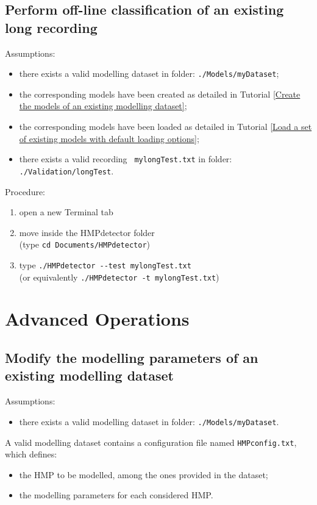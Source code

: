\documentclass[10pt,a4paper]{report}
\begin{document}
\section{Perform off-line classification of an existing long recording}
Assumptions:
\begin{itemize}
\item there exists a valid modelling dataset in folder: \verb+./Models/myDataset+;
\item the corresponding models have been created as detailed in Tutorial \ref{Create the models of an existing modelling dataset};
\item the corresponding models have been loaded as detailed in Tutorial \ref{Load a set of existing models with default loading options};
\item there exists a valid recording \verb+ mylongTest.txt+ in folder: \verb+./Validation/longTest+.
\end{itemize}
Procedure:
\begin{enumerate}
\item open a new Terminal tab
\item move inside the HMPdetector folder\\
(type \verb+cd Documents/HMPdetector+)
\item type \verb+./HMPdetector --test mylongTest.txt+\\
(or equivalently \verb+./HMPdetector -t mylongTest.txt+)
\end{enumerate}

\chapter{Advanced Operations}
\section{Modify the modelling parameters of an existing modelling dataset}
Assumptions:
\begin{itemize}
\item there exists a valid modelling dataset in folder: \verb+./Models/myDataset+.
\end{itemize}

A valid modelling dataset contains a configuration file named \verb+HMPconfig.txt+, which defines:
\begin{itemize}
\item the HMP to be modelled, among the ones provided in the dataset;
\item the modelling parameters for each considered HMP.
\end{itemize}
\end{document}
